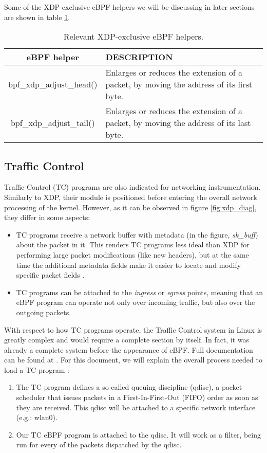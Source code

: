 Some of the XDP-exclusive eBPF helpers we will be discussing in later sections are shown in table \ref{table:xdp_helpers}.
\begin{table}[htbp]
\begin{tabular}{|c|>{\centering\arraybackslash}p{10cm}|}
\hline
eBPF helper & DESCRIPTION\\
\hline
\hline
bpf\_xdp\_adjust\_head() & Enlarges or reduces the extension of a packet, by moving the address of its first byte.\\
\hline
bpf\_xdp\_adjust\_tail() & Enlarges or reduces the extension of a packet, by moving the address of its last byte.\\
\hline
\end{tabular}
\caption{Relevant XDP-exclusive eBPF helpers.}
\label{table:xdp_helpers}
\end{table}


\subsection{Traffic Control} \label{subsection:tc}
Traffic Control (TC) programs are also indicated for networking instrumentation. Similarly to XDP, their module is positioned before entering the overall network processing of the kernel. However, as it can be observed in figure \ref{fig:xdp_diag}, they differ in some aspects:
\begin{itemize}
\item TC programs receive a network buffer with metadata (in the figure, \textit{sk\_buff}) about the packet in it. This renders TC programs less ideal than XDP for performing large packet modifications (like new headers), but at the same time the additional metadata fields make it easier to locate and modify specific packet fields \cite{tc_differences}.
\item TC programs can be attached to the \textit{ingress} or \textit{egress} points, meaning that an eBPF program can operate not only over incoming traffic, but also over the outgoing packets.
\end{itemize}

With respect to how TC programs operate, the Traffic Control system in Linux is greatly complex and would require a complete section by itself. In fact, it was already a complete system before the appearance of eBPF. Full documentation can be found at \cite{tc_docs_complete}. For this document, we will explain the overall process needed to load a TC program \cite{tc_direct_action}:
\begin{enumerate}
\item The TC program defines a so-called queuing discipline (qdisc), a packet scheduler that issues packets in a First-In-First-Out (FIFO) order as soon as they are received. This qdisc will be attached to a specific network interface (e.g.: wlan0).
\item Our TC eBPF program is attached to the qdisc. It will work as a filter, being run for every of the packets dispatched by the qdisc.
\end{enumerate}

